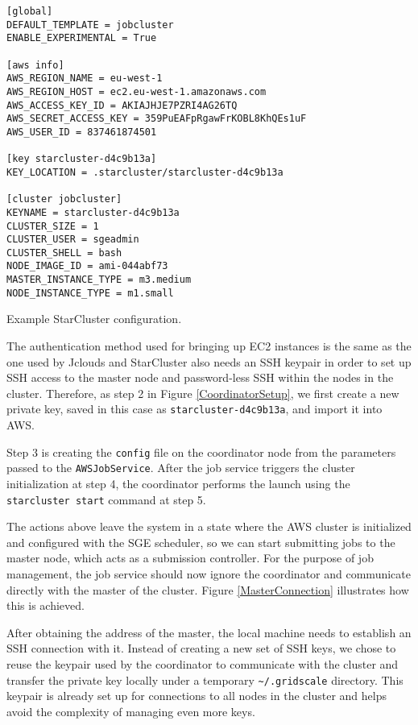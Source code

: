 \begin{listing}[h]
	\centering
	\begin{minipage}{12cm}
		\begin{verbatim}
[global]
DEFAULT_TEMPLATE = jobcluster
ENABLE_EXPERIMENTAL = True

[aws info]
AWS_REGION_NAME = eu-west-1
AWS_REGION_HOST = ec2.eu-west-1.amazonaws.com
AWS_ACCESS_KEY_ID = AKIAJHJE7PZRI4AG26TQ
AWS_SECRET_ACCESS_KEY = 359PuEAFpRgawFrKOBL8KhQEs1uF
AWS_USER_ID = 837461874501

[key starcluster-d4c9b13a]
KEY_LOCATION = .starcluster/starcluster-d4c9b13a

[cluster jobcluster]
KEYNAME = starcluster-d4c9b13a
CLUSTER_SIZE = 1
CLUSTER_USER = sgeadmin
CLUSTER_SHELL = bash
NODE_IMAGE_ID = ami-044abf73
MASTER_INSTANCE_TYPE = m3.medium
NODE_INSTANCE_TYPE = m1.small
		\end{verbatim}
	\end{minipage}
	\caption{Example StarCluster configuration.}
	\label{StarClusterConfig}
\end{listing}


The authentication method used for bringing up EC2 instances is the same as the one used by Jclouds and StarCluster also needs an SSH keypair in order to set up SSH access to the master node and password-less SSH within the nodes in the cluster. Therefore, as step 2 in Figure \ref{CoordinatorSetup}, we first create a new private key, saved in this case as \verb|starcluster-d4c9b13a|, and import it into AWS.

Step 3 is creating the \verb|config| file on the coordinator node from the parameters passed to the \verb|AWSJobService|. After the job service triggers the cluster initialization at step 4, the coordinator performs the launch using the \verb|starcluster start| command at step 5.

The actions above leave the system in a state where the AWS cluster is initialized and configured with the SGE scheduler, so we can start submitting jobs to the master node, which acts as a submission controller. For the purpose of job management, the job service should now ignore the coordinator and communicate directly with the master of the cluster. Figure \ref{MasterConnection} illustrates how this is achieved.

After obtaining the address of the master, the local machine needs to establish an SSH connection with it. Instead of creating a new set of SSH keys, we chose to reuse the keypair used by the coordinator to communicate with the cluster and transfer the private key locally under a temporary \verb|~/.gridscale| directory. This keypair is already set up for connections to all nodes in the cluster and helps avoid the complexity of managing even more keys.

